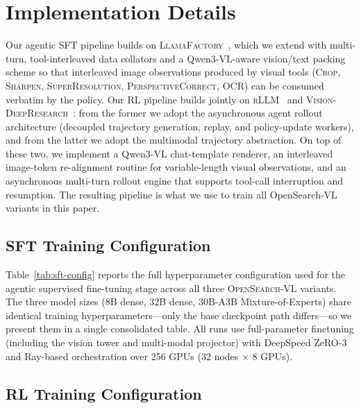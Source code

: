 \section{Implementation Details}
\label{apdx:implementation-details}

Our agentic SFT pipeline builds on \textsc{LlamaFactory}~\citep{zheng2024llamafactory}, which we extend with multi-turn, tool-interleaved data collators and a Qwen3-VL-aware vision/text packing scheme so that interleaved image observations produced by visual tools (\textsc{Crop}, \textsc{Sharpen}, \textsc{SuperResolution}, \textsc{PerspectiveCorrect}, \textsc{OCR}) can be consumed verbatim by the policy. Our RL pipeline builds jointly on \textsc{rLLM}~\citep{rllm2025} and \textsc{Vision-DeepResearch}~\citep{huang2026vision}: from the former we adopt the asynchronous agent rollout architecture (decoupled trajectory generation, replay, and policy-update workers), and from the latter we adopt the multimodal trajectory abstraction. On top of these two, we implement a Qwen3-VL chat-template renderer, an interleaved image-token re-alignment routine for variable-length visual observations, and an asynchronous multi-turn rollout engine that supports tool-call interruption and resumption. The resulting pipeline is what we use to train all OpenSearch-VL variants in this paper.

\subsection{SFT Training Configuration}
\label{apdx:sft-config}



Table~\ref{tab:sft-config} reports the full hyperparameter configuration used for the agentic supervised fine-tuning stage across all three \textsc{OpenSearch-VL} variants. The three model sizes (8B dense, 32B dense, 30B-A3B Mixture-of-Experts) share identical training hyperparameters---only the base checkpoint path differs---so we present them in a single consolidated table. All runs use full-parameter finetuning (including the vision tower and multi-modal projector) with DeepSpeed ZeRO-3 and Ray-based orchestration over 256 GPUs (32 nodes $\times$ 8 GPUs).


\subsection{RL Training Configuration}
\label{apdx:rl-config}



